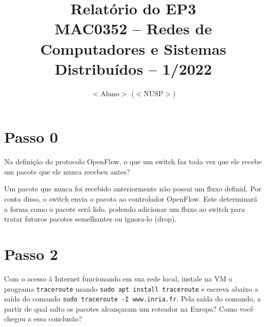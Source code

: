 \documentclass[12pt,letterpaper]{article}
\title{Relatório do EP3\\MAC0352 -- Redes de Computadores e Sistemas Distribuídos -- 1/2022}
\author{$<$Aluno$>$ ($<$NUSP$>$)}
\date{}
\begin{document}
\maketitle

\section{Passo 0}

Na definição do protocolo OpenFlow, o que um switch faz toda vez que
ele recebe um pacote que ele nunca recebeu antes?

Um pacote que nunca foi recebido anteriormente não possui um fluxo definid. Por conta disso, o switch envia o pacota ao controlador OpenFlow.
Este determinará a forma como o pacote será lido, podendo adicionar um fluxo ao switch para tratar futuros pacotes semelhantes ou ignora-lo (drop).

\section{Passo 2}


Com o acesso à Internet funcionando em sua rede local, instale na VM o
programa \texttt{traceroute} usando \texttt{sudo apt install
traceroute} e escreva abaixo a saída do comando \texttt{sudo
traceroute -I www.inria.fr}. Pela saída do comando, a partir de qual
salto os pacotes alcançaram um roteador na Europa? Como você chegou a
essa conclusão?
\end{document}
